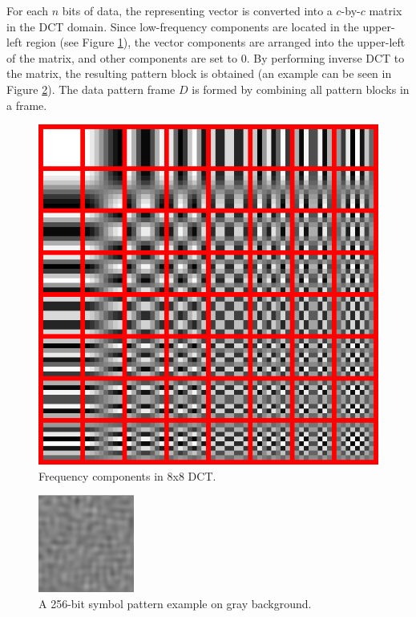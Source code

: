 \documentclass{acm_proc_article-sp}
\begin{document}
For each $n$ bits of data, the representing vector is converted into a $c$-by-$c$ matrix in the DCT domain. Since low-frequency components are located in the upper-left region (see Figure \ref{fig:dct8x8}), the vector components are arranged into the upper-left of the matrix, and other components are set to $0$. By performing inverse DCT to the matrix, the resulting pattern block is obtained (an example can be seen in Figure \ref{fig:symbol}). The data pattern frame $D$ is formed by combining all pattern blocks in a frame.

\begin{figure}
    \centering
    \includegraphics[scale=0.28]{figures/dct8x8}
    \caption{Frequency components in 8x8 DCT.}
    \label{fig:dct8x8}
\end{figure}

\begin{figure}
    \centering
    \includegraphics[scale=0.5]{figures/symbol}
    \caption{A 256-bit symbol pattern example on gray background.}
    \label{fig:symbol}
\end{figure}
\end{document}
